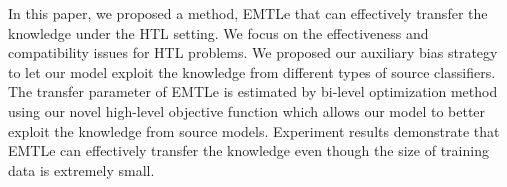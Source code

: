 In this paper, we proposed a method, EMTLe that can effectively transfer the knowledge under the HTL setting. We focus on the effectiveness and compatibility issues for HTL problems. We proposed our auxiliary bias strategy to let our model exploit the knowledge from different types of source classifiers. The transfer parameter of EMTLe is estimated by bi-level optimization method using our novel high-level objective function which allows our model to better exploit the knowledge from source models. Experiment results demonstrate that EMTLe can effectively transfer the knowledge even though the size of training data is extremely small.

